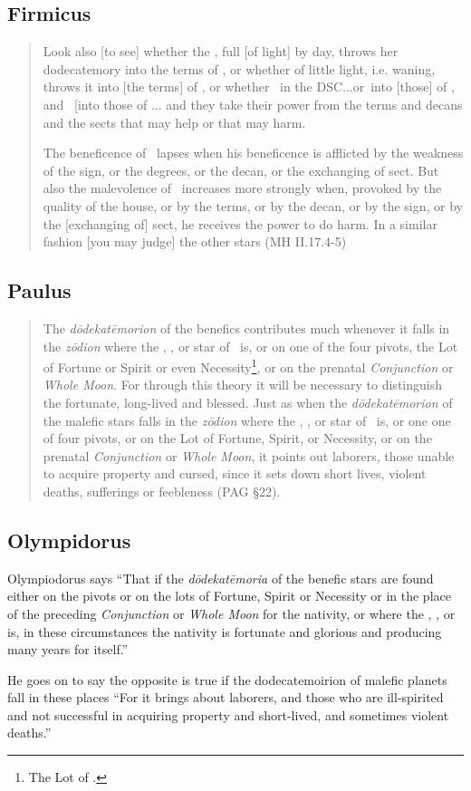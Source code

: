 \subsection{Firmicus}
\begin{quote}
Look also [to see] whether the \Moon, full [of light] by day, throws her dodecatemory into the terms of \Mars, or whether of little light, i.e. waning, throws it into [the terms] of \Saturn, or whether \Mars\, in the DSC...or\Venus\, into [those] of \Mars, and \Mars\, [into those of \Venus... and they take their power from the terms and decans and the sects that may help or that may harm.

The beneficence of \Jupiter\, lapses when his beneficence is afflicted by the weakness of the sign, or the degrees, or the decan, or the exchanging of sect. But also the malevolence of \Saturn\, increases more strongly when, provoked by the quality of the house, or by the terms, or by the decan, or by the sign, or by the [exchanging of] sect, he receives the power to do harm. In a similar fashion [you may judge] the other stars (MH II.17.4-5)
\end{quote}

\subsection{Paulus}
\begin{quote}
The \textsl{d\=odekat\=emorion} of the benefics contributes much whenever it falls in the \textsl{z\=odion} where the \Sun, \Moon, or star of \Mercury\, is, or on one of the four pivots, the Lot of Fortune or Spirit or even Necessity\footnote{The Lot of \Mercury.}, or on the prenatal \textsl{Conjunction} or \textsl{Whole Moon}. For through this theory it will be necessary to distinguish the fortunate, long-lived and blessed. Just as when the \textsl{d\=odekat\=emorion} of the malefic stars falls in the \textsl{z\=odion} where the \Sun, \Moon, or star of \Mercury\, is, or one one of four pivots, or on the Lot of Fortune, Spirit, or Necessity, or on the prenatal \textsl{Conjunction} or \textsl{Whole Moon}, it points out laborers, those unable to acquire property and cursed, since it sets down short lives, violent deaths, sufferings or feebleness (PAG \S22).
\end{quote}

\subsection{Olympidorus}
Olympiodorus says ``That if the \textsl{d\={o}dekat\={e}moria} of the benefic stars are found either on the pivots or on the lots of Fortune, Spirit or Necessity or in the place of the preceding \textsl{Conjunction} or \textsl{Whole Moon} for the nativity, or where the \Sun, \Moon, or \Mercury\, is, in these circumstances the nativity is fortunate and glorious and producing many years for itself.''

He goes on to say the opposite is true if the dodecatemoirion of malefic planets fall in these places ``For it brings about laborers, and those who are ill-spirited and not successful in acquiring property and short-lived, and sometimes violent deaths.'' 
